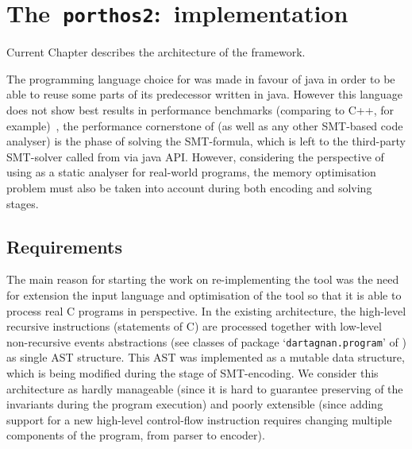 \chapter{The~\texttt{porthos2}:~implementation}
\label{ch:impl}



Current Chapter describes the architecture of the \porthos[2] framework.

The programming language choice for \porthos[2] was made in favour of java in order to be able to reuse some parts of its predecessor \porthos{} written in java.
However this language does not show best results in performance benchmarks (comparing to C++, for example)~\cite{TODO}, the performance cornerstone of \porthos[2] (as well as any other SMT-based code analyser) is the phase of solving the SMT-formula, which is left to the third-party SMT-solver called from \porthos[2] via java API.
However, considering the perspective of using \porthos[2] as a static analyser for real-world programs, the memory optimisation problem must also be taken into account during both encoding and solving stages.



\section{Requirements}
\label{ch:impl:req}

The main reason for starting the work on re-implementing the \porthos{} tool was the need for extension the input language and optimisation of the tool so that it is able to process real C programs in perspective.
In the existing \porthos{} architecture, the high-level recursive instructions (statements of C) are processed together with low-level non-recursive events abstractions (see classes of package `\texttt{dartagnan.program}' of \porthos) as single AST structure.
This AST was implemented as a mutable data structure, which is being modified during the stage of SMT-encoding.
We consider this architecture as hardly manageable (since it is hard to guarantee preserving of the invariants during the program execution) and poorly extensible (since adding support for a new high-level control-flow instruction requires changing multiple components of the program, from parser to encoder).

